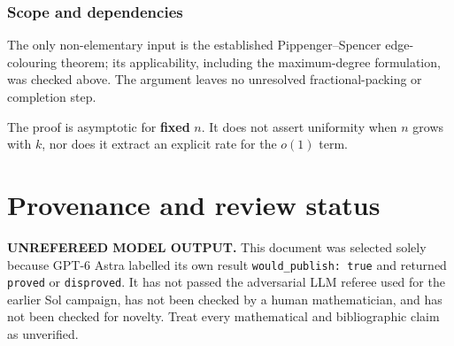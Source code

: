 \documentclass[
  11pt,
  a4paper,
]{article}
\begin{document}
\subsubsection{Scope and dependencies}\label{scope-and-dependencies}

The only non-elementary input is the established Pippenger--Spencer
edge-colouring theorem; its applicability, including the maximum-degree
formulation, was checked above. The argument leaves no unresolved
fractional-packing or completion step.

The proof is asymptotic for \textbf{fixed} \(n\). It does not assert
uniformity when \(n\) grows with \(k\), nor does it extract an explicit
rate for the \(o(1)\) term.

\appendix

\section{Provenance and review
status}\label{provenance-and-review-status}

\begin{warning}

\textbf{UNREFEREED MODEL OUTPUT.} This document was selected solely
because GPT-6 Astra labelled its own result
\texttt{would\_publish:\ true} and returned \texttt{proved} or
\texttt{disproved}. It has not passed the adversarial LLM referee used
for the earlier Sol campaign, has not been checked by a human
mathematician, and has not been checked for novelty. Treat every
mathematical and bibliographic claim as unverified.

\end{warning}
\end{document}
